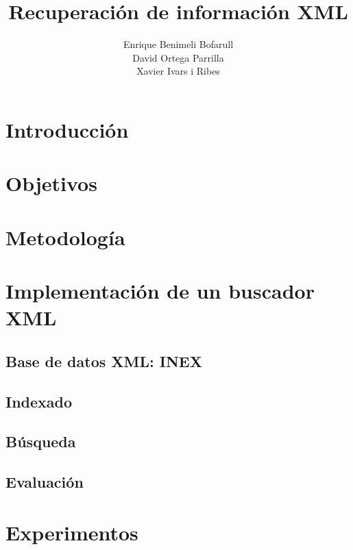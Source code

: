 \documentclass{article}
\title{Recuperaci\'on de informaci\'on XML}
\author{Enrique Benimeli Bofarull\\David Ortega Parrilla\\Xavier Ivars i Ribes}
\begin{document}
\maketitle
\newpage

\tableofcontents
\newpage

\listoftables
\listoffigures
\newpage


\section{Introducci\'on}

\section{Objetivos}

\newpage
\section{Metodolog\'ia}

\section{Implementaci\'on de un buscador XML}

\subsection{Base de datos XML: INEX}

\subsection{Indexado}

\subsection{B\'usqueda}

\subsection{Evaluaci\'on}

\newpage
\section{Experimentos}
\end{document}
